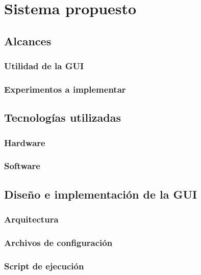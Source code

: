 \documentclass[\main/main.tex]{subfiles}
\begin{document}
\chapter{Sistema propuesto}
\label{cha:03_sistema_propuesto}
\section{Alcances}
\label{sec:03_alcances}
	\subsection{Utilidad de la GUI}
	\label{sub:03_utilidad_de_la_gui}

	\subsection{Experimentos a implementar}
	\label{sub:03_experimentos_a_implementar}

\section{Tecnologías utilizadas}
\label{sec:03_tecnologías_utilizadas}
	\subsection{Hardware}
	\label{sub:03_hardware}

	\subsection{Software}
	\label{sub:03_software}

\section{Diseño e implementación de la GUI}
\label{sec:03_diseño_e_implementación_de_la_gui}
	\subsection{Arquitectura}
	\label{sub:03_arquitectura}

	\subsection{Archivos de configuración}
	\label{sub:03_archivos_de_configuración}

	\subsection{Script de ejecución}
	\label{sub:03_script_de_ejecución}
\end{document}

